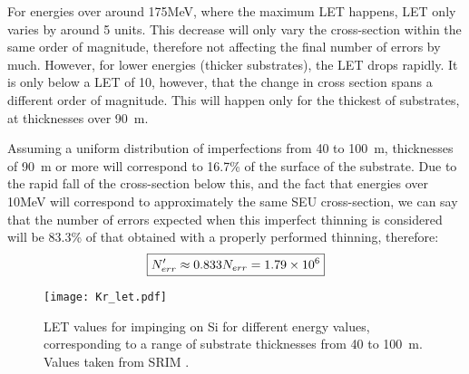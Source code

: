 For energies over around 175\unit{MeV}, where the maximum LET happens, LET only varies by around 5 units. This decrease will only vary the cross-section within the same order of magnitude, therefore not affecting the final number of errors by much. However, for lower energies (thicker substrates), the LET drops rapidly. It is only below a LET of 10, however, that the change in cross section spans a different order of magnitude. This will happen only for the thickest of substrates, at thicknesses over 90\unit{\textmu m}. 
\newpage

Assuming a uniform distribution of imperfections from 40 to 100\unit{\textmu m}, thicknesses of 90\unit{\textmu m} or more will correspond to 16.7\% of the surface of the substrate. Due to the rapid fall of the cross-section below this, and the fact that energies over 10\unit{MeV} will correspond to approximately the same SEU cross-section, we can say that the number of errors expected when this imperfect thinning is considered will be 83.3\% of that obtained with a properly performed thinning, therefore: $$\boxed{N'_{err} \approx 0.833 N_{err} = 1.79\times 10^{6}}$$

\begin{figure}[H]
    \centering
     \texttt{[image: Kr\_let.pdf]}
     \caption{LET values for  impinging on Si for different energy values, corresponding to a range of substrate thicknesses from 40 to 100\unit{\textmu m}. Values taken from SRIM \cite{srim}.} 
     \label{fig:letenergy}
 \end{figure}
